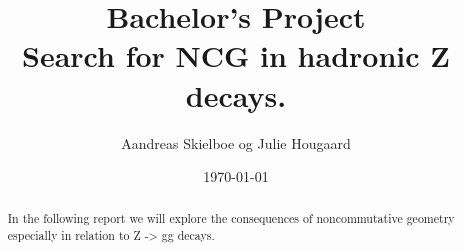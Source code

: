 \documentclass[11pt,a4paper,titlepage]{article}
\numberwithin{equation}{section}
\begin{document}
\title{Bachelor's Project\\Search for NCG in hadronic Z decays.}
\author{Aandreas Skielboe og Julie Hougaard}
\date{\today}
\maketitle
{}

\begin{abstract}
In the following report we will explore the consequences of noncommutative geometry especially in relation to Z -> gg decays.
\end{abstract}

\clearpage
\tableofcontents
\clearpage





















\clearpage



\clearpage










\end{document}
